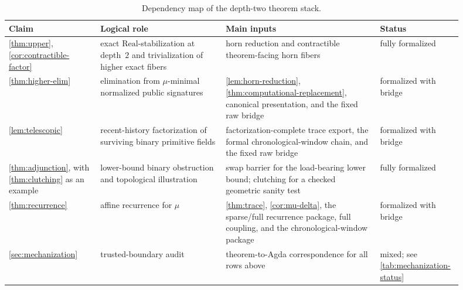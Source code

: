 \documentclass{lmcs}
\newcommand{\Real}{\mathrm{Real}}
\begin{document}
\begin{table}[t]
\centering
\caption{Dependency map of the depth-two theorem stack.}
\label{tab:claim-map}
\small
\begin{tabular}{@{}p{0.19\linewidth}p{0.26\linewidth}p{0.32\linewidth}p{0.13\linewidth}@{}}
\toprule
Claim & Logical role & Main inputs & Status \\
\midrule
\autoref{thm:upper}, \autoref{cor:contractible-factor} & exact $\Real$-stabilization at depth~$2$ and trivialization of higher exact fibers & horn reduction and contractible theorem-facing horn fibers & fully formalized \\
\autoref{thm:higher-elim} & elimination from $\mu$-minimal normalized public signatures & \autoref{lem:horn-reduction}, \autoref{thm:computational-replacement}, canonical presentation, and the fixed raw bridge & formalized with bridge \\
\autoref{lem:telescopic} & recent-history factorization of surviving binary primitive fields & factorization-complete trace export, the formal chronological-window chain, and the fixed raw bridge & formalized with bridge \\
\autoref{thm:adjunction}, with \autoref{thm:clutching} as an example & lower-bound binary obstruction and topological illustration & swap barrier for the load-bearing lower bound; clutching for a checked geometric sanity test & fully formalized \\
\autoref{thm:recurrence} & affine recurrence for $\mu$ & \autoref{thm:trace}, \autoref{cor:mu-delta}, the sparse/full recurrence package, full coupling, and the chronological-window package & formalized with bridge \\
\autoref{sec:mechanization} & trusted-boundary audit & theorem-to-Agda correspondence for all rows above & mixed; see \autoref{tab:mechanization-status} \\
\bottomrule
\end{tabular}
\end{table}
\end{document}

